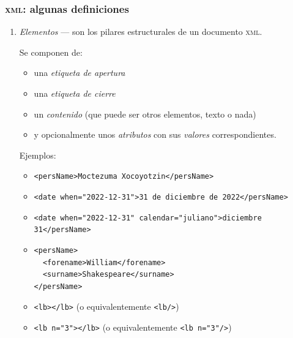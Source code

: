 \documentclass[%
  handout, %
  xcolor=svgnames]{beamer}
\newcommand*{\rojoit}[1]{\textit{\textcolor[HTML]{8B0000}{#1}}}
\newcommand*{\XML}{\textsc{xml}}
\begin{document}
\begin{frame}[fragile]
  \frametitle{\XML: algunas definiciones}
  \begin{enumerate}
    \item \rojoit{Elementos} --- son los pilares estructurales de un documento \XML.

      Se componen de:
      \begin{itemize}
        \item una \textit{etiqueta de apertura}
        \item una \textit{etiqueta de cierre}
        \item un \textit{contenido} (que puede ser otros elementos, texto o nada)
        \item y opcionalmente unos \textit{atributos} con sus \textit{valores} correspondientes.
      \end{itemize}
      Ejemplos:

      \begin{itemize}
        \item \texttt{<persName>Moctezuma Xocoyotzin</persName>}
        \item \texttt{<date when="2022-12-31">31 de diciembre de 2022</persName>}
        \item \texttt{<date when="2022-12-31" calendar="juliano">diciembre 31</persName>}
        \item
\begin{verbatim}
<persName>
  <forename>William</forename>
  <surname>Shakespeare</surname>
</persName>
\end{verbatim}
          
        \item \texttt{<lb></lb>} (o equivalentemente \texttt{<lb/>})
        \item \texttt{<lb n="3"></lb>} (o equivalentemente \texttt{<lb n="3"/>})
      \end{itemize}
  \end{enumerate}
\end{frame}
\end{document}
